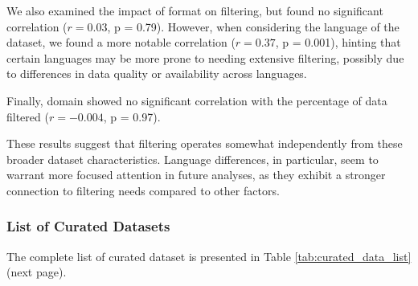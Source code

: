 We also examined the impact of format on filtering, but found no significant correlation (\( r = 0.03 \), p = 0.79). However, when considering the language of the dataset, we found a more notable correlation (\( r = 0.37 \), p = 0.001), hinting that certain languages may be more prone to needing extensive filtering, possibly due to differences in data quality or availability across languages.

Finally, domain showed no significant correlation with the percentage of data filtered (\( r = -0.004 \), p = 0.97).

These results suggest that filtering operates somewhat independently from these broader dataset characteristics. Language differences, in particular, seem to warrant more focused attention in future analyses, as they exhibit a stronger connection to filtering needs compared to other factors. 

\subsubsection{List of Curated Datasets}
The complete list of curated dataset is presented in Table \ref{tab:curated_data_list} (next page).



%

% 
